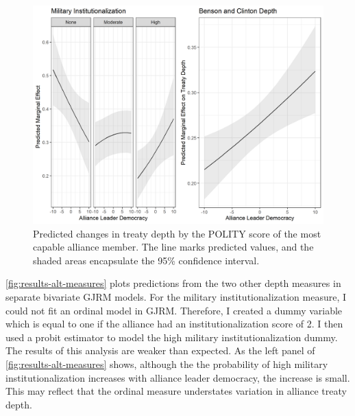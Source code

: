 \documentclass[12pt]{article}
\begin{document}
\begin{figure}
\includegraphics[width=.95\textwidth]{results-alt-measures-sep.png}  
\caption{Predicted changes in treaty depth by the POLITY score of the most capable alliance member. The line marks predicted values, and the shaded areas encapsulate the 95\% confidence interval.}
\label{fig:results-alt-measures-sep}
\end{figure}


\autoref{fig:results-alt-measures} plots predictions from the two other depth measures in separate bivariate GJRM models. 
For the military institutionalization measure, I could not fit an ordinal model in GJRM. 
Therefore, I created a dummy variable which is equal to one if the alliance had an institutionalization score of 2. 
I then used a probit estimator to model the high military institutionalization dummy. 
The results of this analysis are weaker than expected. 
As the left panel of \autoref{fig:results-alt-measures} shows, although the the probability of high military institutionalization increases with alliance leader democracy, the increase is small. 
This may reflect that the ordinal measure understates variation in alliance treaty depth. 
\end{document}
